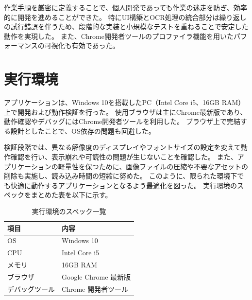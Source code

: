 \documentclass[main]{subfiles}
\begin{document}
作業手順を厳密に定義することで、個人開発であっても作業の迷走を防ぎ、効率的に開発を進めることができた。
特にUI構築とOCR処理の統合部分は繰り返しの試行錯誤を伴うため、段階的な実装と小規模なテストを重ねることで安定した動作を実現した。
また、Chrome開発者ツールのプロファイラ機能を用いたパフォーマンスの可視化も有効であった。

\section{実行環境}

アプリケーションは、Windows 10を搭載したPC（Intel Core i5、16GB RAM）上で開発および動作検証を行った。
使用ブラウザは主にChrome最新版であり、動作確認やデバッグにはChrome開発者ツールを利用した。
ブラウザ上で完結する設計としたことで、OS依存の問題も回避した。

検証段階では、異なる解像度のディスプレイやフォントサイズの設定を変えて動作確認を行い、表示崩れや可読性の問題が生じないことを確認した。
また、アプリケーションの軽量性を保つために、画像ファイルの圧縮や不要なアセットの削除も実施し、読み込み時間の短縮に努めた。
このように、限られた環境下でも快適に動作するアプリケーションとなるよう最適化を図った。
実行環境のスペックをまとめた表を以下に示す。

\begin{table}[htbp]
\centering
\caption{実行環境のスペック一覧}
\label{tab:execution_environment}
\begin{tabular}{ll}
\hline
項目 & 内容 \\
\hline
OS & Windows 10 \\
CPU & Intel Core i5 \\
メモリ & 16GB RAM \\
ブラウザ & Google Chrome 最新版 \\
デバッグツール & Chrome 開発者ツール \\
\hline
\end{tabular}
\end{table}
\end{document}
